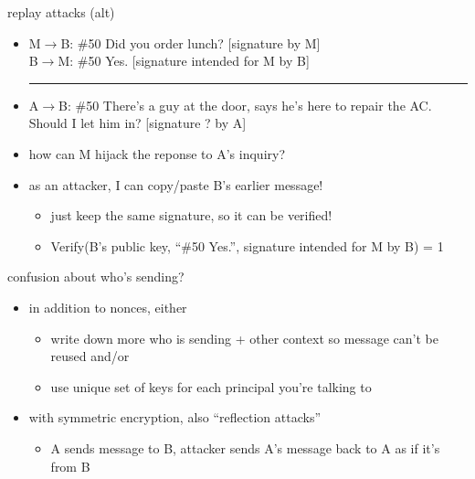\begin{frame}{replay attacks (alt)}
    \begin{itemize}
    \item M$\rightarrow$B: \#50 Did you order lunch? [signature by M] \\
          B$\rightarrow$M: \#50 Yes. [signature intended for M by B]  \\
    \hrule
    \item A$\rightarrow$B: \#50 There's a guy at the door, says he's here to repair the AC. Should I let him in? [signature ? by A]
    \item how can M hijack the reponse to A's inquiry?
    \vspace{.5cm}
    \item<2-> as an attacker, I can copy/paste B's earlier message!
        \begin{itemize}
        \item just keep the same signature, so it can be verified!
        \item Verify(B's public key, ``\#50 Yes.'', signature intended for M by B) = 1
        \end{itemize}
    \end{itemize}
\end{frame}

\begin{frame}{confusion about who's sending?}
    \begin{itemize}
    \item in addition to nonces, either
        \begin{itemize}
        \item write down more who is sending + other context so message can't be reused and/or
        \item use unique set of keys for each principal you're talking to
        \end{itemize}
    \vspace{.5cm}
    \item with symmetric encryption, also ``reflection attacks''
        \begin{itemize}
        \item A sends message to B, attacker sends A's message back to A as if it's from B
        \end{itemize}
    \end{itemize}
\end{frame}

